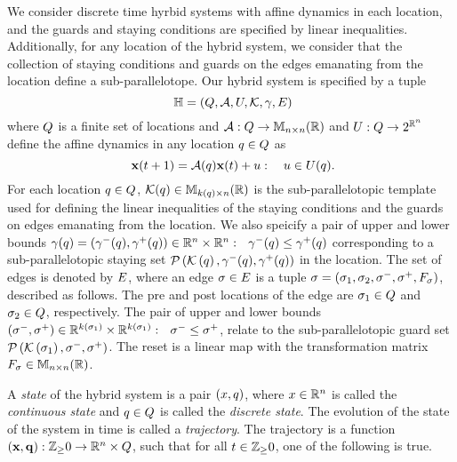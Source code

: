 We consider discrete time hyrbid systems with affine dynamics in each
location, and the guards and staying conditions are specified by
linear inequalities.  Additionally, for any location of the hybrid
system, we consider that the collection of staying conditions and
guards on the edges emanating from the location define a
sub-parallelotope.  Our hybrid system is specified by a tuple
\begin{equation}~\label{eqn:system}
\mathbb{H} =
\left(Q,\mathcal{A},U,\mathcal{K},\gamma,E\right)
\end{equation}
where $Q$ is a finite set of locations and
$\mathcal{A}:Q\rightarrow\mathbb{M}_{n\times n}(\mathbb{R})$ and
$U:Q\rightarrow 2^{\mathbb{R}^n}$ define the affine dynamics in any
location $q\in Q$ as 
\begin{equation}~\label{eqn:next}
{\bf x}(t+1) = \mathcal{A}(q){\bf x}(t)+u:~~~u\in U(q).
\end{equation}
For each location $q\in Q$,
$\mathcal{K}(q)\in\mathbb{M}_{k(q)\times n}(\mathbb{\mathbb{R}})$ is the sub-parallelotopic
template used for defining the linear inequalities of the staying
conditions and the guards on edges emanating from the location.  We also
speicify a 
pair of upper and lower bounds
$\gamma(q)=\left(\gamma^-(q),\gamma^+(q)\right)\in\mathbb{R}^n\times\mathbb{R}^n:
~~\gamma^-(q)\leq\gamma^+(q)$ corresponding to a sub-parallelotopic
staying set
$\mathcal{P}\left(\mathcal{K}\left(q\right),\gamma^-(q),\gamma^+(q)\right)$ in the
location.  The set of edges is denoted by $E$, where an edge
$\sigma\in E$ is a tuple $\sigma =
\left(\sigma_{1},\sigma_{2},\sigma^-,\sigma^+,F_{\sigma}\right)$,
described as follows.  The pre and post locations of the edge are
$\sigma_{1}\in Q$ and $\sigma_{2}\in Q$,
respectively.  The pair of upper and lower bounds
$\left(\sigma^-,\sigma^+\right)\in\mathbb{R}^{k\left(\sigma_{1}\right)}\times\mathbb{R}^{k\left(\sigma_{1}\right)}:~~\sigma^-\leq\sigma^+$,
relate to the sub-parallelotopic guard set
$\mathcal{P}\left(\mathcal{K}\left(\sigma_{1}\right),\sigma^-,\sigma^+\right)$.  The
reset is a linear map with the transformation matrix
$F_{\sigma}\in\mathbb{M}_{n\times n}(\mathbb{R})$.

A \emph{state} of the hybrid system is a pair $(x,q)$, where
$x\in\mathbb{R}^n$ is called the \emph{continuous state} and
$q\in Q$ is called the \emph{discrete state}.  The
evolution of the state of the system in time is called a
\emph{trajectory}.  The trajectory is a function
$\left({\bf x},{\bf q}\right):\mathbb{Z}_\geq 0\rightarrow\mathbb{R}^n\times Q$, such
that for all $t\in\mathbb{Z}_\geq 0$, one of the following is true.

